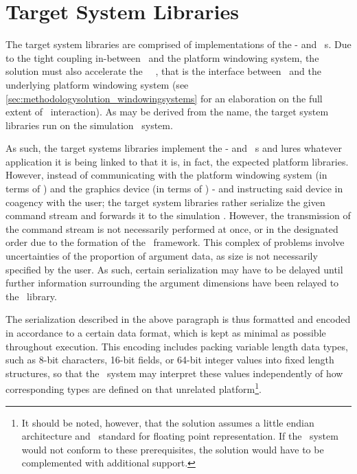
\section{Target System Libraries}
\label{sec:methodologysolution_targetsystemlibraries}
The target system libraries are comprised of implementations of the \dvttermegl - and \dvttermopengl\ \dvttermapi s.
Due to the tight coupling in-between \dvttermopengl\ and the platform windowing system, the solution must also accelerate the \dvttermkhronos\ \dvttermegl\ \dvttermapi , that is the interface between \dvttermopengl\ and the underlying platform windowing system (see \ref{sec:methodologysolution_windowingsystems} for an elaboration on the full extent of \dvttermegl\ interaction).
As may be derived from the name, the target system libraries run on the simulation \dvttermtarget\ system.

As such, the target systems libraries implement the \dvttermegl - and \dvttermopenglestwopointo\ \dvttermapi s and lures whatever application it is being linked to that it is, in fact, the expected platform libraries.
However, instead of communicating with the platform windowing system (in terms of \dvttermegl ) and the graphics device (in terms of \dvttermopengl ) - and instructing said device in coagency with the user; the target system libraries rather serialize the given command stream and forwards it to the simulation \dvttermhost .
However, the transmission of the command stream is not necessarily performed at once, or in the designated order due to the formation of the \dvttermopenglestwopointo\ framework.
This complex of problems involve uncertainties of the proportion of argument data, as size is not necessarily specified by the user.
As such, certain serialization may have to be delayed until further information surrounding the argument	dimensions have been relayed to the \dvttermopengl\ library.

The serialization described in the above paragraph is thus formatted and encoded in accordance to a certain data format, which is kept as minimal as possible throughout execution.
This encoding includes packing variable length data types, such as 8-bit characters, 16-bit fields, or 64-bit integer values into fixed length structures, so that the \dvttermhost\ system may interpret these values independently of how corresponding types are defined on that unrelated platform\footnote{It should be noted, however, that the solution assumes a little endian architecture and \dvttermieeefp\ standard for floating point representation. If the \dvttermhost\ system would not conform to these prerequisites, the solution would have to be complemented with additional support.}.

